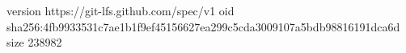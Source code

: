 version https://git-lfs.github.com/spec/v1
oid sha256:4fb9933531c7ae1b1f9ef45156627ea299c5cda3009107a5bdb98816191dca6d
size 238982
